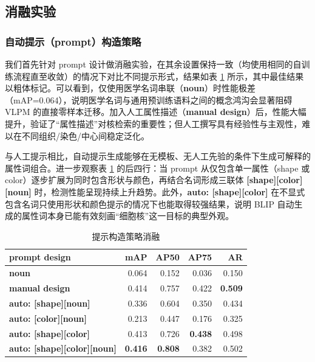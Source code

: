 \subsection{消融实验}
\subsubsection{自动提示（prompt）构造策略}
我们首先针对 prompt 设计做消融实验，在其余设置保持一致（均使用相同的自训练流程直至收敛）的情况下对比不同提示形式，结果如表 \ref{tab:zeroshot_prompt} 所示，其中最佳结果以粗体标记。可以看到，仅使用医学名词串联（\textbf{noun}）时性能极差（mAP=0.064），说明医学名词与通用预训练语料之间的概念鸿沟会显著阻碍 VLPM 的直接零样本迁移。加入人工属性描述（\textbf{manual design}）后，性能大幅提升，验证了“属性描述”对核检索的重要性；但人工撰写具有经验性与主观性，难以在不同组织/染色/中心间稳定泛化。

与人工提示相比，自动提示生成能够在无模板、无人工先验的条件下生成可解释的属性词组合。进一步观察表 \ref{tab:zeroshot_prompt} 的后四行：当 prompt 从仅包含单一属性（shape 或 color）逐步扩展为同时包含形状与颜色，再结合名词形成三联体 \textbf{[shape][color][noun]} 时，检测性能呈现持续上升趋势。此外，\textbf{auto: [shape][color]} 在不显式包含名词只使用形状和颜色提示的情况下也能取得较强结果，说明 BLIP 自动生成的属性词本身已能有效刻画“细胞核”这一目标的典型外观。

\begin{table}[htbp]
  \centering
  \renewcommand{\arraystretch}{1.1}
  \caption{提示构造策略消融}
  \label{tab:zeroshot_prompt}
  \begin{tabular}{l|rrrr}
    \hline
    \textbf{prompt design} & \textbf{mAP} & \textbf{AP50} & \textbf{AP75} & \textbf{AR} \\ \hline
    \textbf{noun} & 0.064 & 0.152 & 0.036 & 0.150 \\
    \textbf{manual design} & 0.414 & 0.757 & 0.422 & \textbf{0.509} \\ \hline
    \textbf{auto: [shape][noun]} & 0.336 & 0.604 & 0.350 & 0.434 \\
    \textbf{auto: [color][noun]} & 0.213 & 0.447 & 0.176 & 0.325 \\
    \textbf{auto: [shape][color]} & 0.413 & 0.726 & \textbf{0.438} & 0.498 \\
    \textbf{auto: [shape][color][noun]} & \textbf{0.416} & \textbf{0.808} & 0.382 & 0.502 \\ \hline
  \end{tabular}
\end{table}



